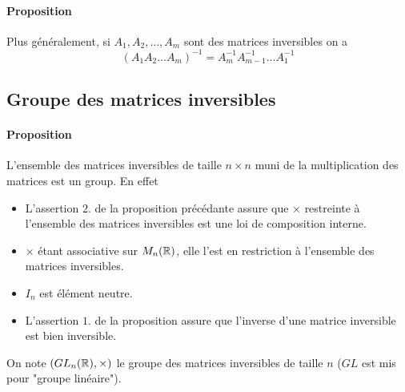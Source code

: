 \paragraph{Proposition} Plus généralement, si $A_1, A_2, \ldots, A_m$ sont des matrices inversibles on a 
$$(A_1 A_2 \ldots A_m)^{-1} = A_m^{-1} A_{m-1}^{-1} \ldots A_1^{-1}$$

%
\subsection{Groupe des matrices inversibles}
%
\paragraph{Proposition} L'ensemble des matrices inversibles de taille $n \times n$ muni de la multiplication des matrices est un group. En effet
\begin{itemize}
  \item L'assertion $2.$ de la proposition précédante assure que $\times$ restreinte à l'ensemble des matrices inversibles est une loi de composition interne.
  \item $\times$ étant associative sur $M_{n}(\mathbb{R})$, elle l'est en restriction à l'ensemble des matrices inversibles.
  \item $I_n$ est élément neutre.
  \item L'assertion $1.$ de la proposition assure que l'inverse d'une matrice inversible est bien inversible.
\end{itemize}
On note $(GL_{n}(\mathbb{R}), \times)$ le groupe des matrices inversibles de taille $n$ ($GL$ est mis pour "groupe linéaire").

